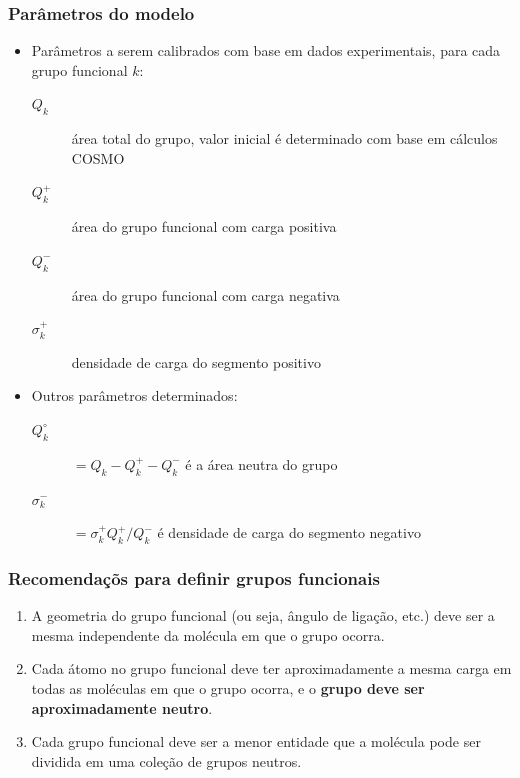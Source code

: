 \documentclass[aspectratio=169]{beamer}
\begin{document}
\begin{frame}
  \frametitle{Parâmetros do modelo}
  \begin{itemize}
    \item Parâmetros a serem calibrados com base em dados experimentais,
    	para cada grupo funcional $k$:
	\begin{description}
	\item [$Q_k$] área total do grupo, valor inicial é determinado com base em cálculos
		COSMO
	\item [$Q_k^+$] área do grupo funcional com carga positiva
	\item [$Q_k^-$] área do grupo funcional com carga negativa
	\item [$\sigma_k^+$] densidade de carga do segmento positivo
 	\end{description}
    \item Outros parâmetros determinados:
	\begin{description}
	\item [$Q_k^\circ$]  $= Q_k - Q_k^+ - Q_k^-$ é a área neutra do grupo
	\item [$\sigma_k^-$] $= \sigma_k^+Q_k^+ / Q_k^-$ é densidade de carga do segmento negativo
 	\end{description}
  \end{itemize}
\end{frame}

\begin{frame}
  \frametitle{Recomendaçõs para definir grupos funcionais}
  \begin{enumerate}
    \item A geometria do grupo funcional (ou seja, ângulo de ligação, etc.)
    deve ser a mesma independente da molécula em que o grupo ocorra.
    \item Cada átomo no grupo funcional deve ter aproximadamente a mesma
    carga em todas as moléculas em que o grupo ocorra, e o \textbf{grupo deve
    ser aproximadamente neutro}.
    \item Cada grupo funcional deve ser a menor entidade que a molécula pode
    ser dividida em uma coleção de grupos neutros.    
  \end{enumerate}
\end{frame}
\end{document}
